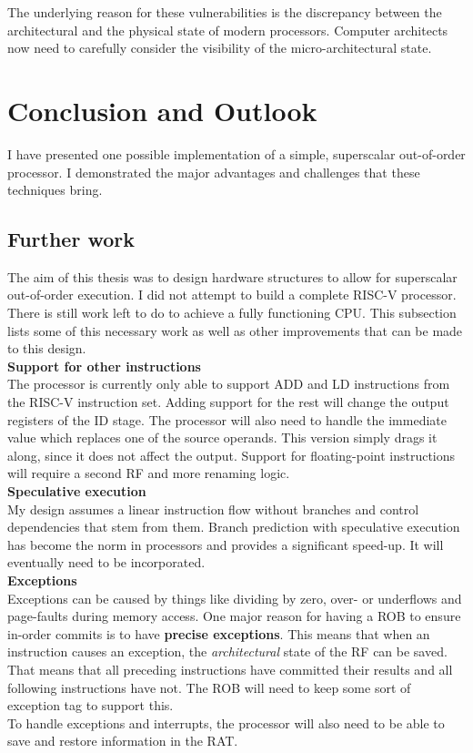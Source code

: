 \documentclass[12pt,a4paper]{article} %
\begin{document}
The underlying reason for these vulnerabilities is the discrepancy between the architectural and the physical state of modern processors. Computer architects now need to carefully consider the visibility of the micro-architectural state.

\newpage
\section{Conclusion and Outlook} \label{sec-outlook} \label{sec-conclusion}

I have presented one possible implementation of a simple, superscalar out-of-order processor. I demonstrated the major advantages and challenges that these techniques bring. 

\subsection{Further work}
The aim of this thesis was to design hardware structures to allow for superscalar out-of-order execution. I did not attempt to build a complete RISC-V processor. There is still work left to do to achieve a fully functioning CPU. This subsection lists some of this necessary work as well as other improvements that can be made to this design. \\

\textbf{Support for other instructions}\\
	The processor is currently only able to support ADD and LD instructions from the RISC-V instruction set. Adding support for the rest will change the output registers of the ID stage. The processor will also need to handle the immediate value which replaces one of the source operands. This version simply drags it along, since it does not affect the output. Support for floating-point instructions will require a second RF and more renaming logic.\\

\textbf{Speculative execution}\\
	My design assumes a linear instruction flow without branches and control dependencies that stem from them. Branch prediction with speculative execution has become the norm in processors and provides a significant speed-up. It will eventually need to be incorporated.\\
	
\textbf{Exceptions}\\
	Exceptions can be caused by things like dividing by zero, over- or underflows and page-faults during memory access. One major reason for having a ROB to ensure in-order commits is to have \textbf{precise exceptions}. This means that when an instruction causes an exception, the \textit{architectural} state of the RF can be saved. That means that all preceding instructions have committed their results and all following instructions have not. The ROB will need to keep some sort of exception tag to support this.\\
	To handle exceptions and interrupts, the processor will also need to be able to save and restore information in the RAT.\\
	
\end{document}
